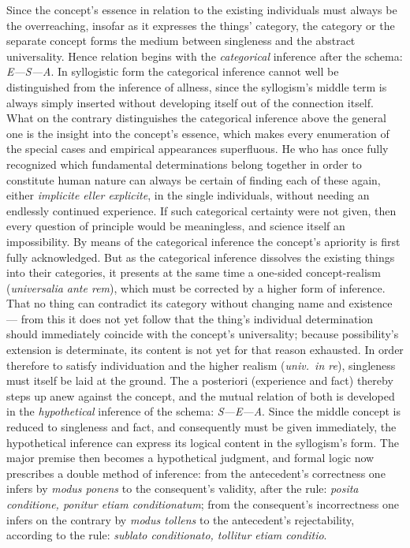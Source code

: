 \documentclass[12pt]{book}
\begin{document}
Since the concept's essence in relation to the existing individuals must
always be the overreaching, insofar as it expresses the things' category,
the category or the separate concept forms the medium between singleness and
the abstract universality. Hence relation begins with the \emph{categorical}
inference after the schema: \textit{E---S---A}. In syllogistic form the
categorical inference cannot well be distinguished from the inference of
allness, since the syllogism's middle term is always simply inserted without
developing itself out of the connection itself. What on the contrary
distinguishes the categorical inference above the general one is the insight
into the concept's essence, which makes every enumeration of the special
cases and empirical appearances superfluous. He who has once fully
recognized which fundamental determinations belong together in order to
constitute human nature can always be certain of finding each of these
again, either \textit{implicite eller explicite}, in the single individuals,
without needing an endlessly continued experience. If such categorical
certainty were not given, then every question of principle would be
meaningless, and science itself an impossibility. By means of the
categorical inference the concept's apriority is first fully acknowledged.
But as the categorical inference dissolves the existing things into their
categories, it presents at the same time a one-sided concept-realism
(\textit{universalia ante rem}), which must be corrected by a higher form of
inference. That no thing can contradict its category without changing name
and existence --- from this it does not yet follow that the thing's
individual determination should immediately coincide with the concept's
universality; because possibility's extension is determinate, its content is
not yet for that reason exhausted. In order therefore to satisfy
individuation and the higher realism (\textit{univ.\ in re}), singleness
must itself be laid at the ground. The a posteriori (experience and fact)
thereby steps up anew against the concept, and the mutual relation of both
is developed in the \emph{hypothetical} inference of the schema:
\textit{S---E---A}. Since the middle concept is reduced to singleness and
fact, and consequently must be given immediately, the hypothetical inference
can express its logical content in the syllogism's form. The major premise
then becomes a hypothetical judgment, and formal logic now prescribes a
double method of inference: from the antecedent's correctness one infers by
\textit{modus ponens} to the consequent's validity, after the rule:
\textit{posita conditione, ponitur etiam conditionatum}; from the
consequent's incorrectness one infers on the contrary by \textit{modus
tollens} to the antecedent's rejectability, according to the rule:
\textit{sublato conditionato, tollitur etiam conditio}.
\end{document}
